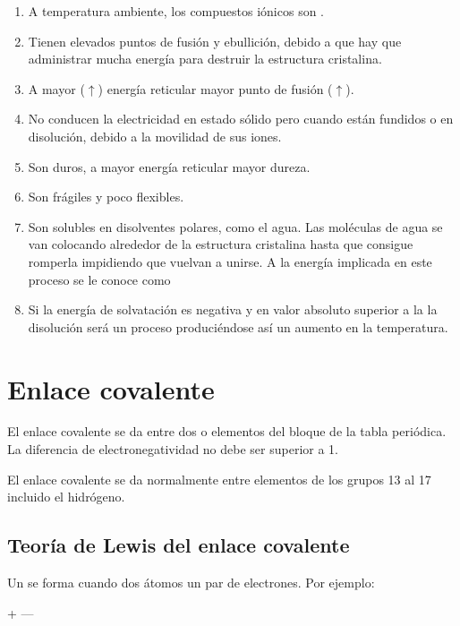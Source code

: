 \begin{enumerate}[label=\numberballmDarkTeal]
        \item A temperatura ambiente, los compuestos iónicos son .
        \item Tienen elevados puntos de fusión y ebullición, debido a que hay que administrar mucha energía para destruir la estructura cristalina.
        \item A mayor ($\uparrow$) energía reticular mayor punto de fusión ($\uparrow$).
        \item No conducen la electricidad en estado sólido pero  cuando están fundidos o en disolución, debido a la movilidad de sus iones.
        \item Son duros, a mayor energía reticular mayor dureza.
        \item Son frágiles y poco flexibles.
        \item Son solubles en disolventes polares, como el agua.
        Las moléculas de agua se van colocando alrededor de la estructura cristalina hasta que consigue romperla impidiendo que vuelvan a unirse.
        A la energía implicada en este proceso se le conoce como 
        \item Si la energía de solvatación es negativa y en valor absoluto superior a la  la disolución será un proceso  produciéndose así un aumento en la temperatura.
\end{enumerate}


\section{Enlace covalente}

El enlace covalente se da entre dos  o elementos del bloque  de la tabla periódica.
La diferencia de electronegatividad no debe ser superior a 1.

El enlace covalente se da normalmente entre elementos de los grupos 13 al 17 incluido el hidrógeno.

\subsection{Teoría de Lewis del enlace covalente}

Un  se forma cuando dos átomos  un par de electrones. Por ejemplo:
    \begin{center}
         +  \ch{->} \hspace{-0.5em}---\hspace{-0.75em}
    \end{center}


